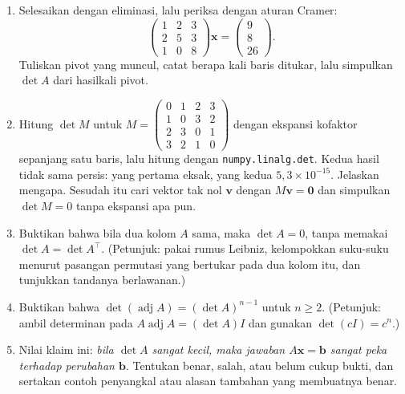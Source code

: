 \begin{latihan}
\begin{enumerate}
  \item Selesaikan dengan eliminasi, lalu periksa dengan aturan Cramer:
        \[
          \begin{pmatrix}1&2&3\\ 2&5&3\\ 1&0&8\end{pmatrix}\mathbf{x}
          =\begin{pmatrix}9\\ 8\\ 26\end{pmatrix}.
        \]
        Tuliskan pivot yang muncul, catat berapa kali baris ditukar, lalu simpulkan
        $\det A$ dari hasilkali pivot.

  \item Hitung $\det M$ untuk
        $M=\begin{pmatrix}0&1&2&3\\ 1&0&3&2\\ 2&3&0&1\\ 3&2&1&0\end{pmatrix}$
        dengan ekspansi kofaktor sepanjang satu baris, lalu hitung dengan
        \texttt{numpy.linalg.det}. Kedua hasil tidak sama persis: yang pertama eksak, yang
        kedua $5{,}3\times10^{-15}$. Jelaskan mengapa. Sesudah itu cari vektor tak nol
        $\mathbf{v}$ dengan $M\mathbf{v}=\mathbf{0}$ dan simpulkan $\det M=0$ tanpa
        ekspansi apa pun.

  \item Buktikan bahwa bila dua kolom $A$ sama, maka $\det A=0$, tanpa memakai
        $\det A=\det A^{\top}$.
        (Petunjuk: pakai rumus Leibniz, kelompokkan suku-suku menurut pasangan permutasi yang
        bertukar pada dua kolom itu, dan tunjukkan tandanya berlawanan.)

  \item Buktikan bahwa $\det(\operatorname{adj}A)=(\det A)^{n-1}$ untuk $n\ge2$.
        (Petunjuk: ambil determinan pada $A\operatorname{adj}A=(\det A)I$ dan gunakan
        $\det(cI)=c^{n}$.)

  \item Nilai klaim ini: \emph{bila $\det A$ sangat kecil, maka jawaban $A\mathbf{x}
        =\mathbf{b}$ sangat peka terhadap perubahan $\mathbf{b}$}. Tentukan benar, salah,
        atau belum cukup bukti, dan sertakan contoh penyangkal atau alasan tambahan yang
        membuatnya benar.


\end{enumerate}
\end{latihan}
